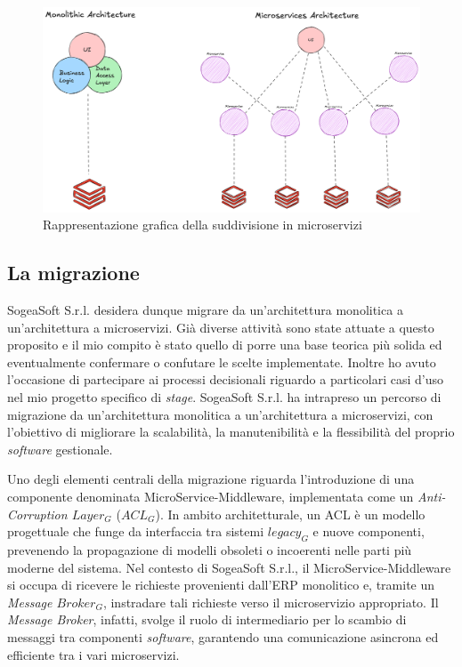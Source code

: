             \begin{figure}[H]
                \centering
                \includegraphics[width=1.0\linewidth]{BCS-Tessi/images/Monolith-Microservices.png}
                \caption[Rappresentazione grafica della suddivisione in microservizi]{Rappresentazione grafica della suddivisione in microservizi}
                \label{fig:monolith-vs-microservices}
            \end{figure}

        \subsection{La migrazione}
        SogeaSoft S.r.l. desidera dunque migrare da un'architettura monolitica a un'architettura a microservizi. Già diverse attività sono state attuate a questo proposito e il mio compito è stato quello di porre una base teorica più solida ed eventualmente confermare o confutare le scelte implementate. Inoltre ho avuto l'occasione di partecipare ai processi decisionali riguardo a particolari casi d'uso nel mio progetto specifico di \textit{stage}. 
        SogeaSoft S.r.l. ha intrapreso un percorso di migrazione da un'architettura monolitica a un'architettura a microservizi, con l'obiettivo di migliorare la scalabilità, la manutenibilità e la flessibilità del proprio \textit{software} gestionale.  

        \vspace{0.2 em}
        \noindent Uno degli elementi centrali della migrazione riguarda l'introduzione di una componente denominata MicroService-Middleware, implementata come un \textit{Anti-Corruption $Layer_G$} ($ACL_G$). In ambito architetturale, un ACL è un modello progettuale che funge da interfaccia tra sistemi $legacy_G$ e nuove componenti, prevenendo la propagazione di modelli obsoleti o incoerenti nelle parti più moderne del sistema. Nel contesto di SogeaSoft S.r.l., il MicroService-Middleware si occupa di ricevere le richieste provenienti dall'ERP monolitico e, tramite un \textit{Message $Broker_G$}, instradare tali richieste verso il microservizio appropriato. Il \textit{Message Broker}, infatti, svolge il ruolo di intermediario per lo scambio di messaggi tra componenti \textit{software}, garantendo una comunicazione asincrona ed efficiente tra i vari microservizi.  

